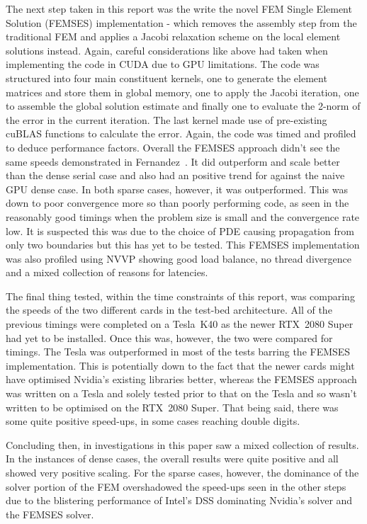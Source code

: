 The next step taken in this report was the write the novel FEM Single Element Solution (FEMSES) implementation - which removes the assembly step from the traditional FEM and applies a Jacobi relaxation scheme on the local element solutions instead. Again, careful considerations like above had taken when implementing the code in CUDA due to GPU limitations. The code was structured into four main constituent kernels, one to generate the element matrices and store them in global memory, one to apply the Jacobi iteration, one to assemble the global solution estimate and finally one to evaluate the 2-norm of the error in the current iteration. The last kernel made use of pre-existing cuBLAS functions to calculate the error. Again, the code was timed and profiled to deduce performance factors. Overall the FEMSES approach didn't see the same speeds demonstrated in Fernandez~\cite{femses}. It did outperform and scale better than the dense serial case and also had an positive trend for against the naive GPU dense case. In both sparse cases, however, it was outperformed. This was down to poor convergence more so than poorly performing code, as seen in the reasonably good timings when the problem size is small and the convergence rate low. It is suspected this was due to the choice of PDE causing propagation from only two boundaries but this has yet to be tested. This FEMSES implementation was also profiled using NVVP showing good load balance, no thread divergence and a mixed collection of reasons for latencies.

The final thing tested, within the time constraints of this report, was comparing the speeds of the two different cards in the test-bed architecture. All of the previous timings were completed on a Tesla~K40 as the newer RTX~2080 Super had yet to be installed. Once this was, however, the two were compared for timings. The Tesla was outperformed in most of the tests barring the FEMSES implementation. This is potentially down to the fact that the newer cards might have optimised Nvidia's existing libraries better, whereas the FEMSES approach was written on a Tesla and solely tested prior to that on the Tesla and so wasn't written to be optimised on the RTX~2080 Super. That being said, there was some quite positive speed-ups, in some cases reaching double digits.

Concluding then, in investigations in this paper saw a mixed collection of results. In the instances of dense cases, the overall results were quite positive and all showed very positive scaling. For the sparse cases, however, the dominance of the solver portion of the FEM overshadowed the speed-ups seen in the other steps due to the blistering performance of Intel's DSS dominating Nvidia's solver and the FEMSES solver. 

